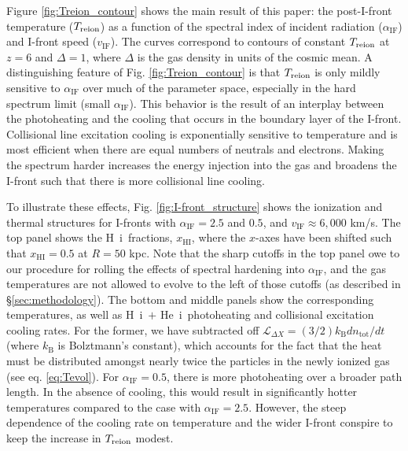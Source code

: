 \documentclass[twocolumn]{aastex62}
\newcommand{\HI}{H{\sc~i}}
\newcommand{\HeI}{He{\sc~i}}
\newcommand{\Treion}{T_{\rm reion}}
\newcommand{\vIF}{v_{\mathrm{IF}}}
\newcommand{\spec}{\alpha_{\mathrm{IF}}}
\begin{document}
Figure \ref{fig:Treion_contour} shows the main result of this paper: the post-I-front temperature ($\Treion$) as a function of the spectral index of incident radiation ($\spec$) and I-front speed ($\vIF$).  The curves correspond to contours of constant $\Treion$ at $z=6$ and $\Delta = 1$, where $\Delta$ is the gas density in units of the cosmic mean.  A distinguishing feature of Fig. \ref{fig:Treion_contour} is that $\Treion$ is only mildly sensitive to $\spec$ over much of the parameter space, especially in the hard spectrum limit (small $\spec$).  This behavior is the result of an interplay between the photoheating and the cooling that occurs in the boundary layer of the I-front.   Collisional line excitation cooling is exponentially sensitive to temperature and is most efficient when there are equal numbers of neutrals and electrons.  Making the spectrum harder increases the energy injection into the gas and broadens the I-front such that there is more collisional line cooling.  

To illustrate these effects, Fig. \ref{fig:I-front_structure} shows the ionization and thermal structures for I-fronts with $\spec=2.5$ and $0.5$, and $\vIF \approx 6,000$ km/s.  The top panel shows the \HI\ fractions, $x_{\mathrm{HI}}$, where the $x$-axes have been shifted such that $x_{\mathrm{HI}}=0.5$ at $R=50$ kpc.  Note that the sharp cutoffs in the top panel owe to our procedure for rolling the effects of spectral hardening into $\spec$, and the gas temperatures are not allowed to evolve to the left of those cutoffs (as described in \S \ref{sec:methodology}). The bottom and middle panels show the corresponding temperatures, as well as  \HI\ $+$ \HeI\ photoheating and collisional excitation cooling rates.   For the former, we have subtracted off $\mathcal{L}_{\Delta X} = (3/2) k_{\mathrm{B}} dn_{\mathrm{tot}}/dt$ (where $k_\mathrm{B}$ is Bolztmann's constant), which accounts for the fact that the heat must be distributed amongst nearly twice the particles in the newly ionized gas (see eq. {\ref{eq:Tevol}}).  For $\spec=0.5$, there is more photoheating over a broader path length.  In the absence of cooling, this would result in significantly hotter temperatures compared to the case with $\spec=2.5$.  However, the steep dependence of the cooling rate on temperature and the wider I-front conspire to keep the increase in $\Treion$ modest.  
\end{document}

